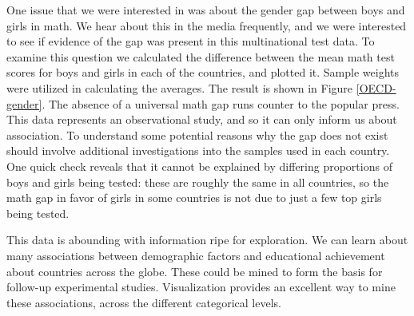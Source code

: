 \documentclass{article}
\begin{document}
One issue that we were interested in was about the gender gap between boys and girls in math. We hear about this in the media frequently, and we were interested to see if evidence of the gap was present in this multinational test data. To examine this question we calculated the difference between the mean math test scores for boys and girls in each of the countries, and plotted it. Sample weights were utilized in calculating the averages. The result is shown in Figure \ref{OECD-gender}. The absence of a universal math gap runs counter to the popular press. This data represents an observational study, and so it can only inform us about association. To understand some potential reasons why the gap does not exist should involve additional investigations into the samples used in each country. One quick check reveals that it cannot be explained by differing proportions of boys and girls being tested: these are roughly the same in all countries, so the math gap in favor of girls in some countries is not due to just a few top girls being tested.

This data is abounding with information ripe for exploration. We can learn about many associations between demographic factors and educational achievement about countries across the globe. These could be mined to form the basis for follow-up experimental studies. Visualization provides an excellent way to mine these associations, across the different categorical levels.
\end{document}
